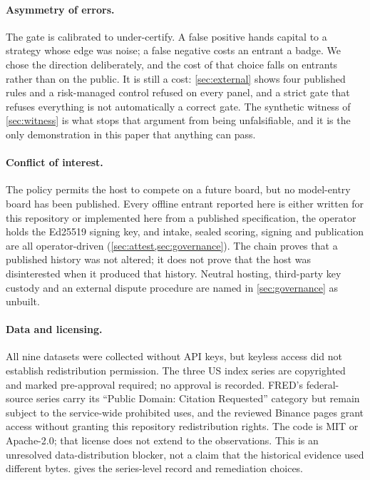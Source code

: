 \paragraph{Asymmetry of errors.} The gate is calibrated to under-certify. A false positive hands capital to a strategy whose edge was noise; a false negative costs an entrant a badge. We chose the direction deliberately, and the cost of that choice falls on entrants rather than on the public. It is still a cost: \cref{sec:external} shows four published rules and a risk-managed control refused on every panel, and a strict gate that refuses everything is not automatically a correct gate. The synthetic witness of \cref{sec:witness} is what stops that argument from being unfalsifiable, and it is the only demonstration in this paper that anything can pass.

\paragraph{Conflict of interest.} The policy permits the host to compete on a future board, but no model-entry board has been published. Every offline entrant reported here is either written for this repository or implemented here from a published specification, the operator holds the Ed25519 signing key, and intake, sealed scoring, signing and publication are all operator-driven (\cref{sec:attest,sec:governance}). The chain proves that a published history was not altered; it does not prove that the host was disinterested when it produced that history. Neutral hosting, third-party key custody and an external dispute procedure are named in \cref{sec:governance} as unbuilt.

\paragraph{Data and licensing.} All nine datasets were collected without API keys, but keyless access did not establish redistribution permission. The three US index series are copyrighted and marked pre-approval required; no approval is recorded. FRED's federal-source series carry its ``Public Domain: Citation Requested'' category but remain subject to the service-wide prohibited uses, and the reviewed Binance pages grant access without granting this repository redistribution rights. The code is MIT or Apache-2.0; that license does not extend to the observations. This is an unresolved data-distribution blocker, not a claim that the historical evidence used different bytes.  gives the series-level record and remediation choices.

